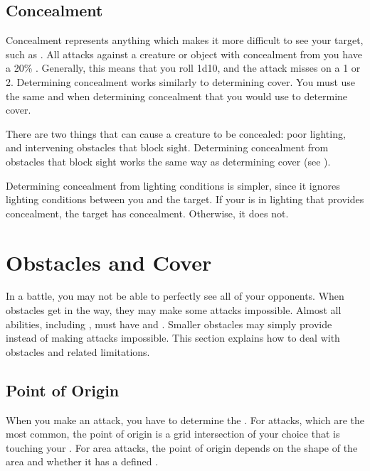   \subsection{Concealment}\label{Concealment}
    Concealment represents anything which makes it more difficult to see your target, such as .
    All  attacks against a creature or object with concealment from you have a 20\% .
    Generally, this means that you roll 1d10, and the attack misses on a 1 or 2.
    Determining concealment works similarly to determining cover.
    You must use the same  and  when determining concealment that you would use to determine cover.

     There are two things that can cause a creature to be concealed: poor lighting, and intervening obstacles that block sight.
    Determining concealment from obstacles that block sight works the same way as determining cover (see ).

    Determining concealment from lighting conditions is simpler, since it ignores lighting conditions between you and the target.
    If your  is in lighting that provides concealment, the target has concealment.
    Otherwise, it does not.

\section{Obstacles and Cover}\label{Obstacles and Cover}
  In a battle, you may not be able to perfectly see all of your opponents.
  When obstacles get in the way, they may make some attacks impossible.
  Almost all abilities, including , must have  and .
  Smaller obstacles may simply provide  instead of making attacks impossible.
  This section explains how to deal with obstacles and related limitations.

  \subsection{Point of Origin}\label{Point of Origin}
    When you make an attack, you have to determine the .
    For  attacks, which are the most common, the point of origin is a grid intersection of your choice that is touching your .
    For area attacks, the point of origin depends on the shape of the area and whether it has a defined .


